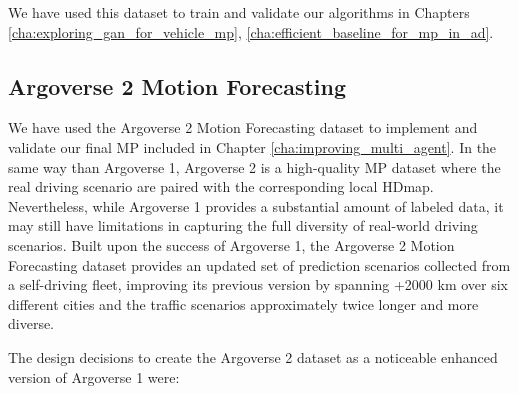 We have used this dataset to train and validate our algorithms in Chapters \ref{cha:exploring_gan_for_vehicle_mp}, \ref{cha:efficient_baseline_for_mp_in_ad}.

\subsection{Argoverse 2 Motion Forecasting}
\label{subsec:2_argoverse_2}

We have used the Argoverse 2 \cite{wilson2023argoverse} Motion Forecasting dataset to implement and validate our final \ac{MP} included in Chapter \ref{cha:improving_multi_agent}. In the same way than Argoverse 1, Argoverse 2 is a high-quality \ac{MP} dataset where the real driving scenario are paired with the corresponding local \ac{HDmap}. Nevertheless, while Argoverse 1 provides a substantial amount of labeled data, it may still have limitations in capturing the full diversity of real-world driving scenarios. Built upon the success of Argoverse 1, the Argoverse 2 Motion Forecasting dataset provides an updated set of prediction scenarios collected from a self-driving fleet, improving its previous version by spanning +2000 km over six different cities and the traffic scenarios approximately twice longer and more diverse.

\begin{comment}
\begin{figure}[h]
	\centering
	\texttt{[image: chapter\_2\_related\_works/mp\_mf\_score\_plateau.pdf]}
	\caption[MinFDE metric values for submissions on Argoverse 1 over time]{MinFDE metric values for submissions on Argoverse 1 over time. Individual points indicate submissions to the public leader board. Colors indicate specific competition phases. The solid black line indicates SOTA performance}
	\label{fig:chapter_2_related_works/mp_mf_score_plateau}
\end{figure}
\end{comment}
	
The design decisions \cite{wilson2023argoverse} to create the Argoverse 2 dataset as a noticeable enhanced version of Argoverse 1 were:


